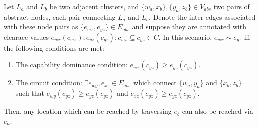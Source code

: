 \begin{theorem}
\label{aha-theorem:weakdominance}
Let $L_{a}$ and $L_{b}$ be two adjacent clusters, and $\lbrace w_{a}, x_{b} \rbrace, \lbrace y_{a}, z_{b} \rbrace \in V_{abs}$ two pairs of abstract nodes, each pair connecting $L_{a}$ and $L_{b}$.
Denote the inter-edges associated with these node pairs as $\lbrace e_{wx}, e_{yz} \rbrace \in E_{abs}$ and suppose they are annotated with clearace values $e_{wx}(c_{wx}), e_{yz}(c_{yz}) : c_{wx} \subseteq c_{yz} \in C$.
 In this scenario, $e_{wx} \sim e_{yz}$ iff the following conditions are met:
\begin{enumerate}
\item{The capability dominance condition: $e_{wx}(c_{yz}) \geq e_{yz}(c_{yz})$}.
\item{The circuit condition: $\exists e_{wy}, e_{xz} \in E_{abs}$ which connect $\lbrace w_{a}, y_{a} \rbrace$ and $\lbrace x_{b}, z_{b} \rbrace$ such that $e_{wy}(c_{yz}) \geq e_{yz}(c_{yz})$ and $e_{xz}(c_{yz}) \geq e_{yz}(c_{yz})$.}
\end{enumerate}
Then, any location which can be reached by traversing $e_{b}$ can also be reached via $e_{a}$.
\end{theorem}

